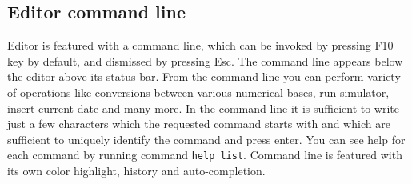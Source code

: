 \documentclass[a4paper,twoside,12pt]{book}
\begin{document}
		\subsection{Editor command line}
			Editor is featured with a command line, which can be invoked by pressing F10 key by default, and dismissed by pressing Esc. The command line appears below the editor above its status bar. From the command line you can perform variety of operations like conversions between various numerical bases, run simulator, insert current date and many more. In the command line it is sufficient to write just a few characters which the requested command starts with and which are sufficient to uniquely identify the command and press enter. You can see help for each command by running command \texttt{help list}. Command line is featured with its own color highlight, history and auto-completion.
\end{document}
